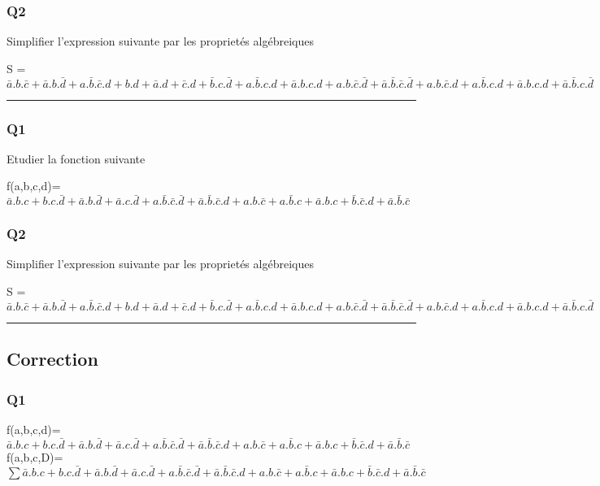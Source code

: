 \subsubsection{Q2}

Simplifier l'expression suivante par les proprietés algébreiques 

S = $\bar a.b.\bar c+\bar a.b.\bar d+a.\bar b.\bar c.d + b.d+\bar a.d+\bar c.d+\bar b.c.\bar d + a.\bar b.c.d+\bar a.b.c.d+a.b.\bar c.\bar d+\bar a.\bar b.\bar c.\bar d + a.b.\bar c.d+a.\bar b.c.d+\bar a.b.c.d+\bar a.\bar b.c.\bar d$

\hrule width 1\linewidth
\subsubsection{Q1}

Etudier la fonction suivante

f(a,b,c,d)= $\bar a.b.c+b.c.\bar d+\bar a.b.\bar d+\bar a.c.\bar d+a.\bar b.\bar c.\bar d+\bar a.\bar b.\bar c.d + a.b.\bar c+a.\bar b.c+\bar a.b.c+\bar b.\bar c.d+\bar a.\bar b.\bar c$

\subsubsection{Q2}

Simplifier l'expression suivante par les proprietés algébreiques 

S = $\bar a.b.\bar c+\bar a.b.\bar d+a.\bar b.\bar c.d + b.d+\bar a.d+\bar c.d+\bar b.c.\bar d + a.\bar b.c.d+\bar a.b.c.d+a.b.\bar c.\bar d+\bar a.\bar b.\bar c.\bar d + a.b.\bar c.d+a.\bar b.c.d+\bar a.b.c.d+\bar a.\bar b.c.\bar d$

\hrule width 1\linewidth\pagebreak
\subsection{Correction}

\subsubsection{Q1}

f(a,b,c,d)=$\bar a.b.c+b.c.\bar d+\bar a.b.\bar d+\bar a.c.\bar d+a.\bar b.\bar c.\bar d+\bar a.\bar b.\bar c.d + a.b.\bar c+a.\bar b.c+\bar a.b.c+\bar b.\bar c.d+\bar a.\bar b.\bar c$
f(a,b,c,D)=$ \sum \bar a.b.c+b.c.\bar d+\bar a.b.\bar d+\bar a.c.\bar d+a.\bar b.\bar c.\bar d+\bar a.\bar b.\bar c.d + a.b.\bar c+a.\bar b.c+\bar a.b.c+\bar b.\bar c.d+\bar a.\bar b.\bar c $ 

